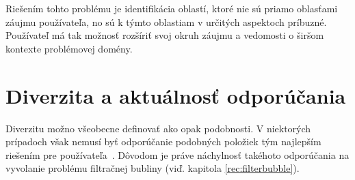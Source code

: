 Riešením tohto problému je identifikácia oblastí, ktoré nie sú priamo oblasťami záujmu používateľa, no sú k týmto
oblastiam v určitých aspektoch príbuzné. Používateľ má tak možnosť rozšíriť svoj okruh záujmu a vedomosti o širšom
kontexte problémovej domény.














\chapter{Diverzita a aktuálnosť odporúčania}

Diverzitu možno všeobecne definovať ako opak podobnosti. V niektorých prípadoch však nemusí byť odporúčanie podobných
položiek tým najlepším riešením pre používateľa~\cite{Handbook2011}. Dôvodom je práve náchylnosť takéhoto odporúčania na
vyvolanie problému filtračnej bubliny (viď. kapitola \ref{rec:filterbubble}).

